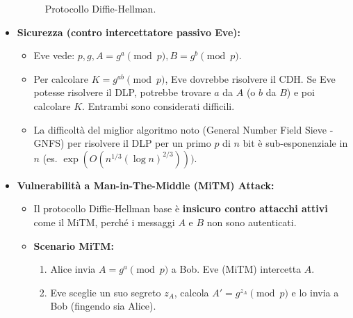 \begin{itemize}
\begin{figure}[H]
            \caption{Protocollo Diffie-Hellman.}
            \label{fig:diffie_hellman}
        \end{figure}
    \item \textbf{Sicurezza (contro intercettatore passivo Eve):}
        \begin{itemize}
            \item Eve vede: $p, g, A=g^a \pmod{p}, B=g^b \pmod{p}$.
            \item Per calcolare $K = g^{ab} \pmod{p}$, Eve dovrebbe risolvere il CDH. Se Eve potesse risolvere il DLP, potrebbe trovare $a$ da $A$ (o $b$ da $B$) e poi calcolare $K$. Entrambi sono considerati difficili.
            \item La difficoltà del miglior algoritmo noto (General Number Field Sieve - GNFS) per risolvere il DLP per un primo $p$ di $n$ bit è sub-esponenziale in $n$ (es. $\exp(O(n^{1/3} (\log n)^{2/3})))$.
        \end{itemize}
    \item \textbf{Vulnerabilità a Man-in-The-Middle (MiTM) Attack:}
        \begin{itemize}
            \item Il protocollo Diffie-Hellman base è \textbf{insicuro contro attacchi attivi} come il MiTM, perché i messaggi $A$ e $B$ non sono autenticati.
            \item \textbf{Scenario MiTM:}
                \begin{enumerate}
                    \item Alice invia $A = g^a \pmod{p}$ a Bob. Eve (MiTM) intercetta $A$.
                    \item Eve sceglie un suo segreto $z_A$, calcola $A' = g^{z_A} \pmod{p}$ e lo invia a Bob (fingendo sia Alice).

\end{enumerate}
\end{itemize}
\end{itemize}
